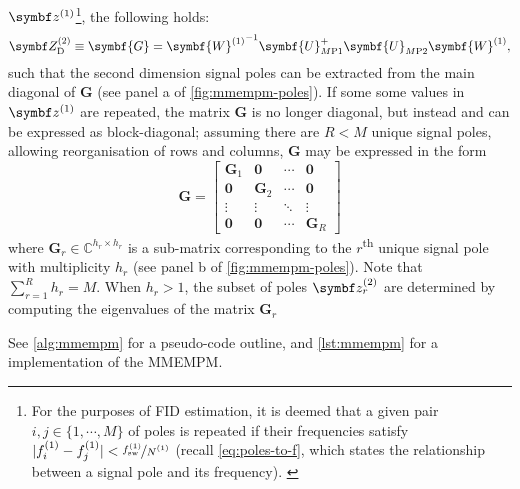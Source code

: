 $\bdzone$\footnote{
    For the purposes of \ac{FID} estimation, it is deemed that a given pair
    $i,j \in \lbrace 1, \cdots, M \rbrace$ of poles is repeated if their
    frequencies satisfy $\lvert \fone_i - \fone_j \rvert <
    \nicefrac{\fswone}{\None}$ (recall \cref{eq:poles-to-f}, which states the
    relationship between a signal pole and its frequency).
    \label{fn:similar-freqs}
}, the following holds:
\begin{equation}
    \bdZtwo_{\text{D}} \equiv \symbf{G} =
        {\symbf{W}^{(1)}}^{-1}
        \symbf{U}_{M\text{P}1}^+
        \symbf{U}_{M\text{P}2}^{\vphantom{+}}
        \symbf{W}^{(1)},
        \label{eq:G}%
\end{equation}
such that the second dimension signal poles can be extracted from the main
diagonal of $\symbf{G}$ (see panel a of \cref{fig:mmempm-poles}).
If some some values in $\bdzone$ are repeated, the matrix $\symbf{G}$ is
no longer diagonal, but instead and can be expressed as block-diagonal;
assuming there are $R < M$ unique signal poles, allowing reorganisation of rows
and columns, $\symbf{G}$ may be expressed in the form
\begin{equation}
    \symbf{G} =
    \begin{bmatrix}
        \symbf{G}_1 & \symbf{0} & \cdots & \symbf{0} \\
        \symbf{0} & \symbf{G}_2 & \cdots & \symbf{0} \\
        \vdots & \vdots & \ddots & \vdots \\
        \symbf{0} & \symbf{0} & \cdots & \symbf{G}_R
    \end{bmatrix}
    \label{eq:block-G}
\end{equation}
where $\symbf{G}_r \in \mathbb{C}^{h_r \times h_r}$ is a sub-matrix corresponding
to the $r$\textsuperscript{th} unique signal pole with multiplicity $h_r$ (see
panel b of \cref{fig:mmempm-poles}). Note that $\sum_{r=1}^R h_r = M$. When
$h_r > 1$, the subset of poles $\bdztwo_r$ are determined by computing the
eigenvalues of the matrix $\symbf{G}_r$

See \cref{alg:mmempm} for a pseudo-code outline, and \cref{lst:mmempm} for a
\Python implementation of the \ac{MMEMPM}.

